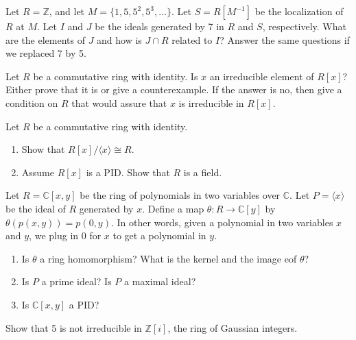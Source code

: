 \documentclass[12pt,letterpaper,boxed]{hmcpset}
\begin{document}


\begin{problem}[17.1.14]
Let $R = \mathbb{Z}$, and let $M = \{1,5,5^2,5^3,...\}$. Let $S = R[M^{-1}]$ be the localization of $R$ at $M$. Let $I$ and $J$ be the ideals generated by 7 in $R$ and $S$, respectively. What are the elements of $J$ and how is $J \cap R$ related to $I$? Answer the same questions if we replaced 7 by 5.
\end{problem}

\begin{solution}
\end{solution}

\clearpage

\begin{problem}[18.1.8]
Let $R$ be a commutative ring with identity. Is $x$ an irreducible element of $R[x]$? Either prove that it is or give a counterexample. If the answer is no, then give a condition on $R$ that would assure that $x$ is irreducible in $R[x]$.
\end{problem}

\begin{solution}
\end{solution}

\clearpage

\begin{problem}[18.1.13]
Let $R$ be a commutative ring with identity.
\begin{enumerate}[label=\alph*]
\item Show that $R[x] / \langle x \rangle \cong R$.
\item Assume $R[x]$ is a PID. Show that $R$ is a field.
\end{enumerate}
\end{problem}

\begin{solution}
\end{solution}

\clearpage

\begin{problem}[18.1.16]
Let $R = \mathbb{C}[x,y]$ be the ring of polynomials in two variables over $\mathbb{C}$. Let $P = \langle x \rangle$ be the ideal of $R$ generated by $x$. Define a map $\theta: R \rightarrow \mathbb{C}[y]$ by $\theta(p(x,y)) = p(0,y)$. In other words, given a polynomial in two variables $x$ and $y$, we plug in 0 for $x$ to get a polynomial in $y$.
\begin{enumerate}[label=\alph*]
\item Is $\theta$ a ring homomorphism? What is the kernel and the image eof  $\theta$?
\item Is $P$ a prime ideal? Is $P$ a maximal ideal?
\item Is $\mathbb{C}[x,y]$ a PID?
\end{enumerate}
\end{problem}

\begin{solution}
\end{solution}

\clearpage

\begin{problem}[18.1.18]
Show that 5 is not irreducible in $\mathbb{Z}[i]$, the ring of Gaussian integers.
\end{problem}

\begin{solution}
\end{solution}
\end{document}
